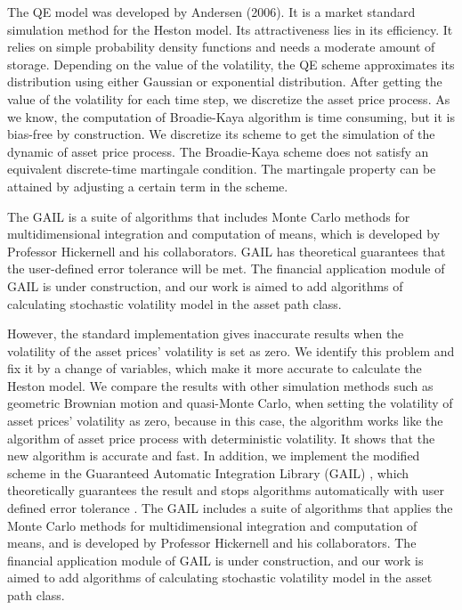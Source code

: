 \documentclass{ws-ijfe}
\begin{document}
The QE model was developed by Andersen (2006). It is a market standard simulation method for the Heston model. Its attractiveness lies in its efficiency. It relies on simple probability density functions and needs a moderate amount of storage. Depending on the value of the volatility, the QE scheme approximates its distribution using either Gaussian or exponential distribution. After getting the value of the volatility for each time step, we discretize the asset price process. As we know, the computation of Broadie-Kaya algorithm is time consuming, but it is bias-free by construction. We discretize its scheme to get the simulation of the dynamic of asset price process. The Broadie-Kaya scheme does not satisfy an equivalent discrete-time martingale condition. The martingale property can be attained by adjusting a certain term in the scheme.

The GAIL is a suite of algorithms that includes Monte Carlo methods for multidimensional integration and computation of means, which is developed by Professor Hickernell and his collaborators. GAIL has theoretical guarantees that the user-defined error tolerance will be met. The financial application module of GAIL is under construction, and our work is aimed to add algorithms of calculating stochastic volatility model in the asset path class.

However, the standard implementation gives inaccurate results when the volatility of the asset prices' volatility is set as zero. We identify this problem and fix it by a change of variables, which make it more accurate to calculate the Heston model. We compare the results with other simulation methods such as geometric Brownian motion and quasi-Monte Carlo, when setting the volatility of asset prices' volatility as zero, because in this case, the algorithm works like the algorithm of asset price process with deterministic volatility. It shows that the new algorithm is accurate and fast. In addition, we implement the modified scheme in the Guaranteed Automatic Integration Library (GAIL) , which theoretically guarantees the result and stops algorithms automatically with user defined error tolerance . The GAIL includes a suite of algorithms that applies the Monte Carlo methods for multidimensional integration and computation of means, and is developed by Professor Hickernell and his collaborators. The financial application module of GAIL is under construction, and our work is aimed to add algorithms of calculating stochastic volatility model in the asset path class.
\end{document}
